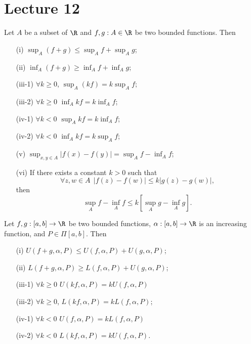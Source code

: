 \section{Lecture 12}

\begin{lemma}[lemma 3]\label{lemma 3}
   Let \( A  \) be a subset of \( \R  \) and \( f,g : A \in \R  \) be two bounded functions. Then 
   \begin{enumerate}
       \item[(i)] \( \sup_{A} (f+g) \leq \sup_{A} f + \sup_{A} g \);
       \item[(ii)] \( \inf_{A} (f+g) \geq \inf_{A} f + \inf_{A} g  \);
       \item[(iii-1)] \( \forall k \geq 0  \), \( \sup_{A} (kf) = k \sup_{A} f \);
       \item[(iii-2)] \(  \forall k \geq 0  \) \( \inf_{A} kf = k \inf_{A} f \);
       \item[(iv-1)] \( \forall k < 0  \) \( \sup_{A} kf = k \inf_{A} f \); 
       \item[(iv-2)] \( \forall k < 0  \) \( \inf_{A} kf = k \sup_{A} f \);
       \item[(v)] \( \sup_{x,y \in A}| f(x) - f(y) | = \sup_{A} f - \inf_{A} f \);
        \item[(vi)] If there exists a constant \( k > 0  \) such that 
            \[  \forall z,w \in A \ \ | f(z) - f(w)  | \leq k | g(z) - g(w) |,  \]
            then
            \[  \sup_{A} f - \inf_{A} f \leq k [\sup_{A} g - \inf_{A}  g].  \]
   \end{enumerate}  
\end{lemma}

\begin{lemma}[lemma 4]\label{lemma 4}
    Let \( f,g: [a,b] \to \R  \) be two bounded functions, \( \alpha: [a,b] \to \R  \) is an increasing function, and \( P \in \Pi[a,b] \). Then
    \begin{enumerate}
        \item[(i)] \( U(f + g,\alpha, P) \leq U(f,\alpha,P) + U(g,\alpha,P) \);
        \item[(ii)] \( L(f+g, \alpha, P) \geq L(f,\alpha,P) + U(g,\alpha, P) \);
        \item[(iii-1)] \( \forall k \geq 0  \) \( U(kf, \alpha, P) = k U(f,\alpha,P) \)
        \item[(iii-2)] \( \forall k \geq 0  \), \( L(kf,\alpha,P) = k L(f,\alpha,P) \);
        \item[(iv-1)] \( \forall k < 0  \) \( U(f,\alpha,P) = k L(f,\alpha,P) \)
        \item[(iv-2)] \( \forall k < 0  \) \( L(kf,\alpha, P) = k U(f,\alpha,P) \).
    \end{enumerate}
\end{lemma}

